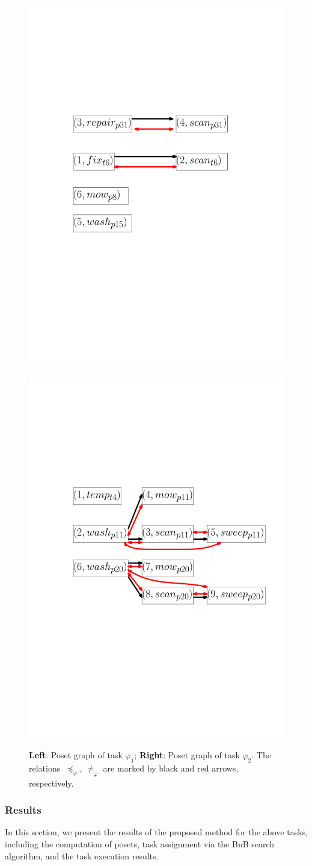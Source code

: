 \begin{figure}[t!]
	\begin{minipage}[t]{0.5\linewidth}
		\centering%
		\includegraphics[height = 0.6 \textwidth]{figures/simulation/task1/ipe_poset_graph.pdf}
	\end{minipage}%
	\begin{minipage}[t]{0.5\linewidth}
		\centering%
		\includegraphics[height = 0.6 \textwidth]{figures/simulation/task2/ipe_poset_graph.pdf}
		\label{fig:poset_graph1}
	\end{minipage}%
	\caption{\textbf{Left}: Poset graph of task $\varphi_1$;
          \textbf{Right}: Poset graph of task $\varphi_2$.
          The relations~$\preceq_\varphi,\, \neq_{\varphi}$ are marked
          by black and red arrows, respectively.}
       \label{fig:task12-posets}
\end{figure}

\subsubsection{Results}\label{subsubsec:results}
In this section, we present the results of the proposed method for
the above tasks, including the computation of posets,
task assignment via the BnB search algorithm, and the task execution results.


